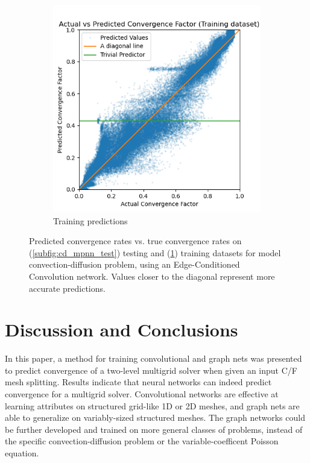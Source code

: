\documentclass{siamart190516}
\begin{document}
\begin{figure}[h]
\begin{subfigure}{.48\textwidth}
    \includegraphics[width=\textwidth]{figs/cd_var_conv_mpnn_train_pred.png}
    \caption{Training predictions}
    \label{subfig:cd_mpnn_train}
  \end{subfigure}
  \caption{Predicted convergence rates vs. true convergence rates on (\ref{subfig:cd_mpnn_test}) testing and (\ref{subfig:cd_mpnn_train}) training datasets for model convection-diffusion problem, using an Edge-Conditioned Convolution network. Values closer to the diagonal represent more accurate predictions.}
  \label{fig:cd_mpnn_pred}
\end{figure}

\section{Discussion and Conclusions}\label{sec:conc}


In this paper, a method for training convolutional and graph nets was presented to predict convergence of a two-level multigrid solver when given an input C/F mesh splitting.
Results indicate that neural networks can indeed predict convergence for a multigrid solver.  Convolutional networks are effective at learning attributes on structured grid-like 1D or 2D meshes, and graph nets are able to generalize on variably-sized structured meshes.  The graph networks could be further developed and trained on more general classes of problems, instead of the specific convection-diffusion problem or the variable-coefficent Poisson equation.
\end{document}
